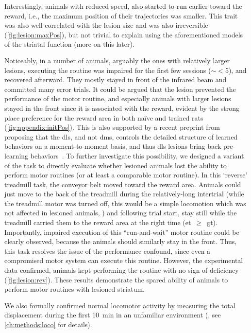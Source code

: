 Interestingly, animals with reduced speed, also started to run earlier toward the reward, i.e., the maximum position of their trajectories was smaller.
This trait was also well-correlated with the lesion size and was also irreversible (\autoref{fig:lesion:maxPos}), but not trivial to explain using the aforementioned models of the striatal function (more on this later).
\par
Noticeably, in a number of animals, arguably the ones with relatively larger lesions, executing the routine was impaired for the first few sessions ($\sim<$5), and recovered afterward.
They mostly stayed in front of the infrared beam and committed many error trials.
It could be argued that the lesion prevented the performance of the motor routine, and especially animals with larger lesions stayed in the front since it is associated with the reward, evident by the strong place preference for the reward area in both na\"{i}ve and trained rats (\autoref{fig:appendix:initPos}).
This is also supported by a recent preprint from \citeauthor{Dhawale2019} proposing that the \gls{dls}, and not \gls{dms}, controls the detailed structure of learned behaviors on a moment-to-moment basis, and thus \gls{dls} lesions bring back pre-learning behaviors~\cite{Dhawale2019}.
To further investigate this possibility, we designed a variant of the task to directly evaluate whether lesioned animals lost the ability to perform motor routines (or at least a comparable motor routine).
In this `reverse' treadmill task, the conveyor belt moved toward the reward area.
Animals could just move to the back of the treadmill during the relatively-long intertrial (while the treadmill motor was turned off, this would be a simple locomotion which was not affected in lesioned animals, ) and following trial start, stay still while the treadmill carried them to the reward area at the right time (\gls{et}~$\geq$~\gls{gt}).
Importantly, impaired execution of this ``run-and-wait'' motor routine could be clearly observed, because the animals should similarly stay in the front.
Thus, this task resolves the issue of the performance confound, since even a compromised motor system can execute this routine.
However, the experimental data confirmed, animals kept performing the routine with no sign of deficiency (\autoref{fig:lesion:rev}).
These results demonstrate the spared ability of animals to perform motor routines with lesioned striatum.
\par
We also formally confirmed normal locomotor activity by measuring the total displacement during the first 10~min in an unfamiliar environment (, see \autoref{ch:methods:loco} for details).
